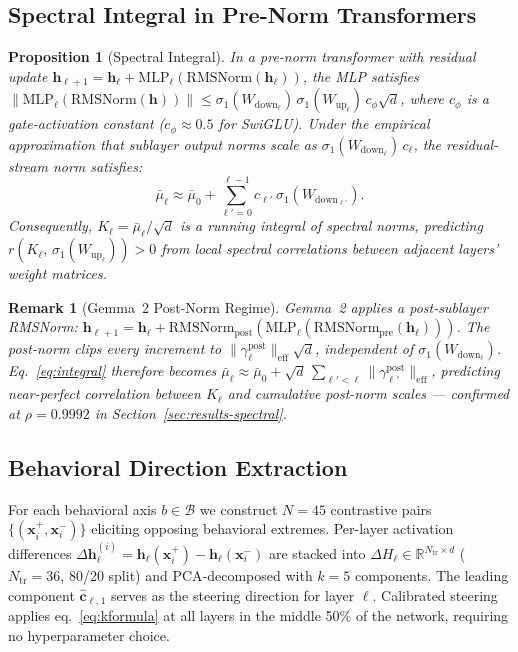 \documentclass{article}
\newtheorem{proposition}{Proposition}
\newtheorem{remark}{Remark}
\newcommand{\hh}{\mathbf{h}}
\newcommand{\ch}{\hat{\mathbf{c}}}
\newcommand{\mubar}{\bar{\mu}}
\newcommand{\sone}{\sigma_1}
\newcommand{\Wup}{W_{\!\mathrm{up}}}
\newcommand{\Wdn}{W_{\!\mathrm{down}}}
\newcommand{\Norm}{\mathrm{RMSNorm}}
\begin{document}
\subsection{Spectral Integral in Pre-Norm Transformers}
\label{sec:spectral-integral}

\begin{proposition}[Spectral Integral]
\label{prop:integral}
In a pre-norm transformer with residual update
$\hh_{\ell+1} = \hh_\ell + \mathrm{MLP}_\ell(\Norm(\hh_\ell))$,
the MLP satisfies $\|\mathrm{MLP}_\ell(\Norm(\hh))\| \leq
\sone(\Wdn_\ell)\,\sone(\Wup_\ell)\,c_\phi\sqrt{d}$,
where $c_\phi$ is a gate-activation constant ($c_\phi \approx 0.5$ for SwiGLU).
Under the empirical approximation that sublayer output norms scale as
$\sone(\Wdn_\ell)\,c_\ell$, the residual-stream norm satisfies:
\begin{equation}
  \mubar_\ell \approx \mubar_0 + \sum_{\ell'=0}^{\ell-1} c_{\ell'}\,\sone(\Wdn_{\ell'}).
  \label{eq:integral}
\end{equation}
Consequently, $K_\ell = \mubar_\ell/\sqrt{d}$ is a running integral of spectral
norms, predicting $r(K_\ell,\,\sone(\Wup_\ell)) > 0$ from local spectral correlations
between adjacent layers' weight matrices.
\end{proposition}

\begin{remark}[Gemma~2 Post-Norm Regime]
\label{rem:gemma}
Gemma~2 applies a post-sublayer RMSNorm:
$\hh_{\ell+1} = \hh_\ell + \Norm_\mathrm{post}(\mathrm{MLP}_\ell(\Norm_\mathrm{pre}(\hh_\ell)))$.
The post-norm clips every increment to $\|\gamma^\mathrm{post}_\ell\|_\mathrm{eff}\sqrt{d}$,
independent of $\sone(\Wdn_\ell)$.
Eq.~\eqref{eq:integral} therefore becomes
$\mubar_\ell \approx \mubar_0 + \sqrt{d}\,\sum_{\ell'<\ell}\|\gamma^\mathrm{post}_{\ell'}\|_\mathrm{eff}$,
predicting near-perfect correlation between $K_\ell$ and cumulative post-norm
scales — confirmed at $\rho{=}0.9992$ in Section~\ref{sec:results-spectral}.
\end{remark}

\subsection{Behavioral Direction Extraction}

For each behavioral axis $b \in \mathcal{B}$ we construct $N{=}45$ contrastive pairs
$\{(\mathbf{x}_i^+,\mathbf{x}_i^-)\}$ eliciting opposing behavioral extremes.
Per-layer activation differences $\Delta\hh_\ell^{(i)} = \hh_\ell(\mathbf{x}_i^+) -
\hh_\ell(\mathbf{x}_i^-)$ are stacked into $\Delta H_\ell \in \mathbb{R}^{N_\mathrm{tr}
\times d}$ ($N_\mathrm{tr}{=}36$, 80/20 split) and PCA-decomposed with $k{=}5$
components.
The leading component $\ch_{\ell,1}$ serves as the steering direction for layer $\ell$.
Calibrated steering applies eq.~\eqref{eq:kformula} at all layers in the middle 50\%
of the network, requiring no hyperparameter choice.
\end{document}
